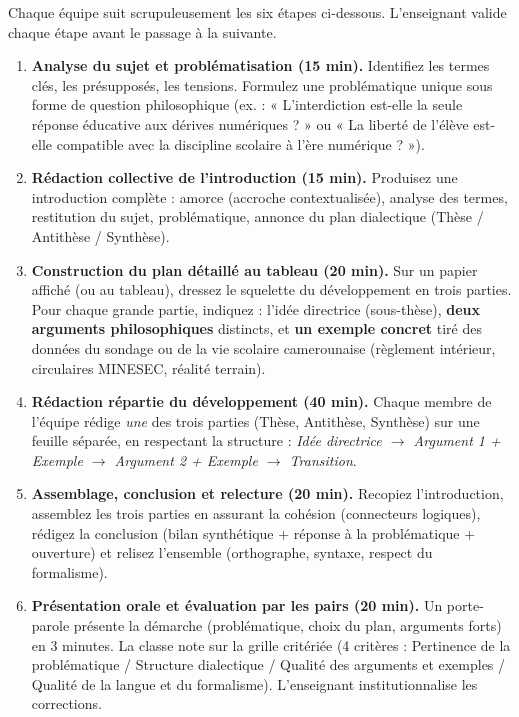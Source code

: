 \documentclass[11pt]{article}
\newcommand{\cle}[1]{{\popxbold\color{popdark}#1}}
\newcounter{popsec}
\newcounter{popsub}
\newcommand{\courssub}[1]{%
  \stepcounter{popsub}%
  \par\vspace{9pt}\noindent{\popxbold\fontsize{11.5}{13}\selectfont\color{popink}{\color{poporange}\thepopsec.\thepopsub}\hspace{6pt}#1}\par\nopagebreak\vspace{4pt}
}
\begin{document}
\courssub{Consignes}
Chaque équipe suit scrupuleusement les six étapes ci-dessous. L'enseignant valide chaque étape avant le passage à la suivante.

\begin{enumerate}
    \item \textbf{Analyse du sujet et problématisation (15 min).} Identifiez les termes clés, les présupposés, les tensions. Formulez une \cle{problématique} unique sous forme de question philosophique (ex. : « L'interdiction est-elle la seule réponse éducative aux dérives numériques ? » ou « La liberté de l'élève est-elle compatible avec la discipline scolaire à l'ère numérique ? »).
    \item \textbf{Rédaction collective de l'introduction (15 min).} Produisez une introduction complète : \cle{amorce} (accroche contextualisée), \cle{analyse des termes}, \cle{restitution du sujet}, \cle{problématique}, \cle{annonce du plan dialectique} (Thèse / Antithèse / Synthèse).
    \item \textbf{Construction du plan détaillé au tableau (20 min).} Sur un papier affiché (ou au tableau), dressez le squelette du développement en trois parties. Pour chaque grande partie, indiquez : l'\cle{idée directrice} (sous-thèse), \textbf{deux arguments philosophiques} distincts, et \textbf{un exemple concret} tiré des données du sondage ou de la vie scolaire camerounaise (règlement intérieur, circulaires MINESEC, réalité terrain).
    \item \textbf{Rédaction répartie du développement (40 min).} Chaque membre de l'équipe rédige \emph{une} des trois parties (Thèse, Antithèse, Synthèse) sur une feuille séparée, en respectant la structure : \emph{Idée directrice $\rightarrow$ Argument 1 + Exemple $\rightarrow$ Argument 2 + Exemple $\rightarrow$ Transition}.
    \item \textbf{Assemblage, conclusion et relecture (20 min).} Recopiez l'introduction, assemblez les trois parties en assurant la cohésion (connecteurs logiques), rédigez la \cle{conclusion} (bilan synthétique + réponse à la problématique + \cle{ouverture}) et relisez l'ensemble (orthographe, syntaxe, respect du formalisme).
    \item \textbf{Présentation orale et évaluation par les pairs (20 min).} Un porte-parole présente la démarche (problématique, choix du plan, arguments forts) en 3 minutes. La classe note sur la \cle{grille critériée} (4 critères : Pertinence de la problématique / Structure dialectique / Qualité des arguments et exemples / Qualité de la langue et du formalisme). L'enseignant institutionnalise les corrections.
\end{enumerate}
\end{document}

